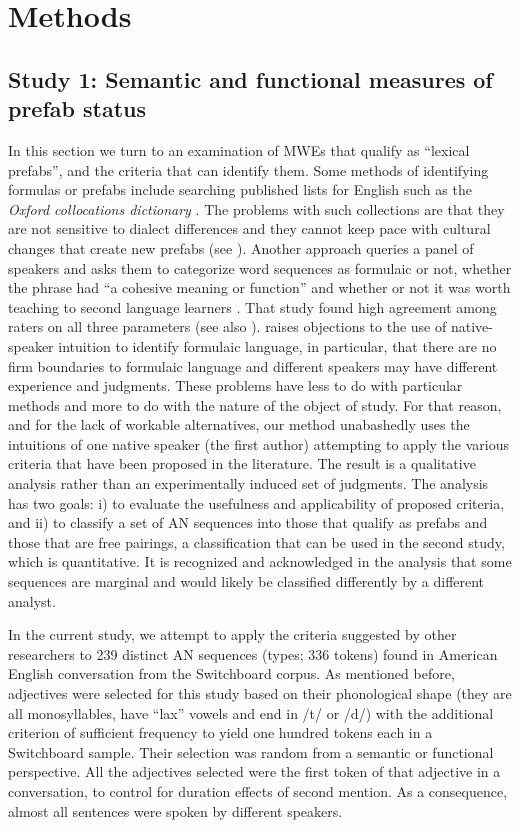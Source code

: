 \documentclass[output=paper]{langscibook}
\begin{document}
\section{Methods}\label{sec:bybee:3}
\subsection{Study 1: Semantic and functional measures of prefab status}\label{sec:bybee:3.1}

In this section we turn to an examination of MWEs that qualify as ``lexical prefabs'', and the criteria that can identify them. Some methods of identifying formulas or prefabs include searching published lists for English such as the \textit{Oxford collocations dictionary} \citep{OxfordCollocationsDictionary2002}. The problems with such collections are that they are not sensitive to dialect differences and they cannot keep pace with cultural changes that create new prefabs (see \citealt{DurrantDoherty2010}).
Another approach queries a panel of speakers and asks them to categorize word sequences as formulaic or not, whether the phrase had ``a cohesive meaning or function'' and whether or not it was worth teaching to second language learners \citep{EllisMaynard2008}. That study found high agreement among raters on all three parameters (see also \citealt{CarrolConklin2014}). \citet{Wray2002} raises objections to the use of native-speaker intuition to identify formulaic language, in particular, that there are no firm boundaries to formulaic language and different speakers may have different experience and judgments. These problems have less to do with particular methods and more to do with the nature of the object of study. For that reason, and for the lack of workable alternatives, our method unabashedly uses the intuitions of one native speaker (the first author) attempting to apply the various criteria that have been proposed in the literature. The result is a qualitative analysis rather than an experimentally induced set of judgments. The analysis has two goals: i) to evaluate the usefulness and applicability of proposed criteria, and ii) to classify a set of AN sequences into those that qualify as prefabs and those that are free  pairings, a classification that can be used in the second study, which is quantitative. It is recognized and acknowledged in the analysis that some sequences are marginal and would likely be classified differently by a different analyst. 

In the current study, we attempt to apply the criteria suggested by other researchers to 239 distinct AN sequences (types; 336 tokens) found in American English conversation from the Switchboard corpus. As mentioned before, adjectives were selected for this study based on their phonological shape (they are all monosyllables, have ``lax'' vowels and end in /t/ or /d/) with the additional criterion of sufficient frequency to yield one hundred tokens each in a Switchboard sample. Their selection was random from a semantic or functional perspective. All the adjectives selected were the first token of that adjective in a conversation, to control for duration effects of second mention. As a consequence, almost all sentences were spoken by different speakers. 
\end{document}
